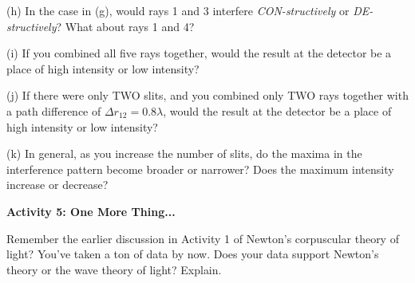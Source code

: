 (h) In the case in (g), would rays 1 and 3 interfere \textit{CON-structively} or \textit{DE-structively}?  What about rays 1 and 4?
\answerspace{0.8in}

(i) If you combined all five rays together, would the result at the detector be a place of high intensity or low intensity? 
\answerspace{0.6in}

(j) If there were only TWO slits, and you combined only TWO rays together with a path difference of $\Delta r_{12} = 0.8\lambda$, would the result at the detector be a place of high intensity or low intensity? 
\answerspace{0.6in}

(k) In general, as you increase the number of slits, do the maxima in the interference pattern become broader or narrower?  Does the maximum intensity increase or decrease?
\answerspace{0.6in}

\textbf{Activity 5: One More Thing...}

Remember the earlier discussion in Activity 1 of Newton's corpuscular theory of
light? You've taken a ton of data by now.  Does your data support Newton's theory or the wave theory of light?
Explain.
\answerspace{1.0in}
